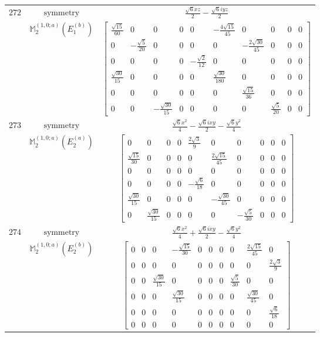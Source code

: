 \documentclass[fleqn,8pt,landscape]{jsarticle}
\begin{document}
\begin{longtable}{ccc}
$ 272 $ & $ \text{symmetry} $ & $ \frac{\sqrt{6} x z}{2} - \frac{\sqrt{6} i y z}{2} $ \\
$  $ & $ \mathbb{M}_{2}^{(1,0;a)}(E_{1}^{(b)}) $ & $ \begin{bmatrix} \frac{\sqrt{15}}{60} & 0 & 0 & 0 & 0 & - \frac{4 \sqrt{15}}{45} & 0 & 0 & 0 & 0 \\ 0 & - \frac{\sqrt{5}}{20} & 0 & 0 & 0 & 0 & - \frac{2 \sqrt{30}}{45} & 0 & 0 & 0 \\ 0 & 0 & 0 & 0 & - \frac{\sqrt{2}}{12} & 0 & 0 & 0 & 0 & 0 \\ \frac{\sqrt{30}}{15} & 0 & 0 & 0 & 0 & \frac{\sqrt{30}}{180} & 0 & 0 & 0 & 0 \\ 0 & 0 & 0 & 0 & 0 & 0 & \frac{\sqrt{15}}{36} & 0 & 0 & 0 \\ 0 & 0 & - \frac{\sqrt{30}}{15} & 0 & 0 & 0 & 0 & \frac{\sqrt{5}}{20} & 0 & 0 \end{bmatrix} $ \\ \hline
$ 273 $ & $ \text{symmetry} $ & $ \frac{\sqrt{6} x^{2}}{4} - \frac{\sqrt{6} i x y}{2} - \frac{\sqrt{6} y^{2}}{4} $ \\
$  $ & $ \mathbb{M}_{2}^{(1,0;a)}(E_{2}^{(a)}) $ & $ \begin{bmatrix} 0 & 0 & 0 & 0 & \frac{2 \sqrt{3}}{9} & 0 & 0 & 0 & 0 & 0 \\ \frac{\sqrt{15}}{30} & 0 & 0 & 0 & 0 & \frac{2 \sqrt{15}}{45} & 0 & 0 & 0 & 0 \\ 0 & 0 & 0 & 0 & 0 & 0 & 0 & 0 & 0 & 0 \\ 0 & 0 & 0 & 0 & - \frac{\sqrt{6}}{18} & 0 & 0 & 0 & 0 & 0 \\ \frac{\sqrt{30}}{15} & 0 & 0 & 0 & 0 & - \frac{\sqrt{30}}{45} & 0 & 0 & 0 & 0 \\ 0 & \frac{\sqrt{30}}{15} & 0 & 0 & 0 & 0 & - \frac{\sqrt{5}}{30} & 0 & 0 & 0 \end{bmatrix} $ \\ \hline
$ 274 $ & $ \text{symmetry} $ & $ \frac{\sqrt{6} x^{2}}{4} + \frac{\sqrt{6} i x y}{2} - \frac{\sqrt{6} y^{2}}{4} $ \\
$  $ & $ \mathbb{M}_{2}^{(1,0;a)}(E_{2}^{(b)}) $ & $ \begin{bmatrix} 0 & 0 & 0 & - \frac{\sqrt{15}}{30} & 0 & 0 & 0 & 0 & \frac{2 \sqrt{15}}{45} & 0 \\ 0 & 0 & 0 & 0 & 0 & 0 & 0 & 0 & 0 & \frac{2 \sqrt{3}}{9} \\ 0 & 0 & \frac{\sqrt{30}}{15} & 0 & 0 & 0 & 0 & \frac{\sqrt{5}}{30} & 0 & 0 \\ 0 & 0 & 0 & \frac{\sqrt{30}}{15} & 0 & 0 & 0 & 0 & \frac{\sqrt{30}}{45} & 0 \\ 0 & 0 & 0 & 0 & 0 & 0 & 0 & 0 & 0 & \frac{\sqrt{6}}{18} \\ 0 & 0 & 0 & 0 & 0 & 0 & 0 & 0 & 0 & 0 \end{bmatrix} $ \\ \hline

\end{longtable}
\end{document}
